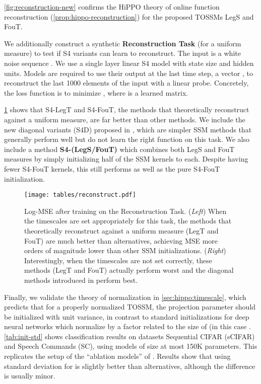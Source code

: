 \documentclass{article}
\begin{document}
\cref{fig:reconstruction-new} confirms the HiPPO theory of online function reconstruction (\cref{prop:hippo-reconstruction}) for the proposed TOSSMs LegS and FouT.

We additionally construct a synthetic \textbf{Reconstruction Task} (for a uniform measure) to test if S4 variants can learn to reconstruct.
The input is a white noise sequence .
We use a single layer linear S4 model with state size  and  hidden units.
Models are required to use their output at the last time step, a vector ,
to reconstruct the last 1000 elements of the input with a linear probe.
Concretely, the loss function is to minimize ,
where  is a learned matrix.


\cref{fig:synthetic-reconstruct} shows that S4-LegT and S4-FouT, the methods that theoretically reconstruct against a uniform measure, are far better than other methods.
We include the new diagonal variants (S4D) proposed in \citep{gu2022s4d}, which are simpler SSM methods that generally perform well but do not learn the right function on this task.
We also include a method \textbf{S4-(LegS/FouT)} which combines both LegS and FouT measures by simply initializing half of the SSM kernels to each.
Despite having fewer S4-FouT kernels, this still performs as well as the pure S4-FouT initialization.

\begin{figure}[!t]
  \centering
  \texttt{[image: tables/reconstruct.pdf]}
  \caption{Log-MSE after training on the Reconstruction Task. (\emph{Left}) When the timescales  are set appropriately for this task, the methods that theoretically reconstruct against a uniform measure (LegT and FouT) are much better than alternatives, achieving MSE more orders of magnitude lower than other SSM initializations.
  (\emph{Right}) Interestingly, when the timescales  are not set correctly, these methods (LegT and FouT) actually perform worst and the diagonal methods introduced in \citep{gu2022s4d} perform best.}
  \label{fig:synthetic-reconstruct}
\end{figure}

Finally, we validate the theory of normalization in \cref{sec:hippo:timescale}, which predicts that for a properly normalized TOSSM, the projection parameter  should be initialized with unit variance, in contrast to standard initializations for deep neural networks which normalize by a factor related to the size of  (in this case .
\cref{tab:init-std} shows classification results on datasets Sequential CIFAR (sCIFAR) and Speech Commands (SC), using models of size at most 150K parameters.
This replicates the setup of the ``ablation models'' of \citep[Section 5]{gu2022s4d}.
Results show that using standard deviation  for  is slightly better than alternatives, although the difference is usually minor.
\end{document}
